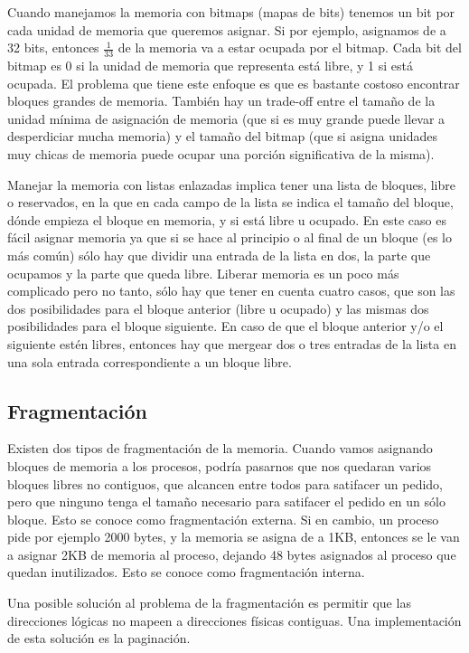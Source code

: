 \documentclass{article}
\begin{document}
Cuando manejamos la memoria con bitmaps (mapas de bits) tenemos un bit por cada unidad de memoria que queremos asignar. Si por ejemplo, asignamos de a 32 bits, entonces $\frac{1}{33}$ de la memoria va a estar ocupada por el bitmap. Cada bit del bitmap es 0 si la unidad de memoria que representa est\'a libre, y 1 si est\'a ocupada. El problema que tiene este enfoque es que es bastante costoso encontrar bloques grandes de memoria. Tambi\'en hay un trade-off entre el tama\~no de la unidad m\'inima de asignaci\'on de memoria (que si es muy grande puede llevar a desperdiciar mucha memoria) y el tama\~no del bitmap (que si asigna unidades muy chicas de memoria puede ocupar una porci\'on significativa de la misma).

Manejar la memoria con listas enlazadas implica tener una lista de bloques, libre o reservados, en la que en cada campo de la lista se indica el tama\~no del bloque, d\'onde empieza el bloque en memoria, y si est\'a libre u ocupado. En este caso es f\'acil asignar memoria ya que si se hace al principio o al final de un bloque (es lo m\'as com\'un) s\'olo hay que dividir una entrada de la lista en dos, la parte que ocupamos y la parte que queda libre. Liberar memoria es un poco m\'as complicado pero no tanto, s\'olo hay que tener en cuenta cuatro casos, que son las dos posibilidades para el bloque anterior (libre u ocupado) y las mismas dos posibilidades para el bloque siguiente. En caso de que el bloque anterior y/o el siguiente est\'en libres, entonces hay que mergear dos o tres entradas de la lista en una sola entrada correspondiente a un bloque libre.

\subsection{Fragmentaci\'on}

Existen dos tipos de fragmentaci\'on de la memoria. Cuando vamos asignando bloques de memoria a los procesos, podr\'ia pasarnos que nos quedaran varios bloques libres no contiguos, que alcancen entre todos para satifacer un pedido, pero que ninguno tenga el tama\~no necesario para satifacer el pedido en un s\'olo bloque. Esto se conoce como fragmentaci\'on externa. Si en cambio, un proceso pide por ejemplo 2000 bytes, y la memoria se asigna de a 1KB, entonces se le van a asignar 2KB de memoria al proceso, dejando 48 bytes asignados al proceso que quedan inutilizados. Esto se conoce como fragmentaci\'on interna.

Una posible soluci\'on al problema de la fragmentaci\'on es permitir que las direcciones l\'ogicas no mapeen a direcciones f\'isicas contiguas. Una implementaci\'on de esta soluci\'on es la paginaci\'on.
\end{document}
